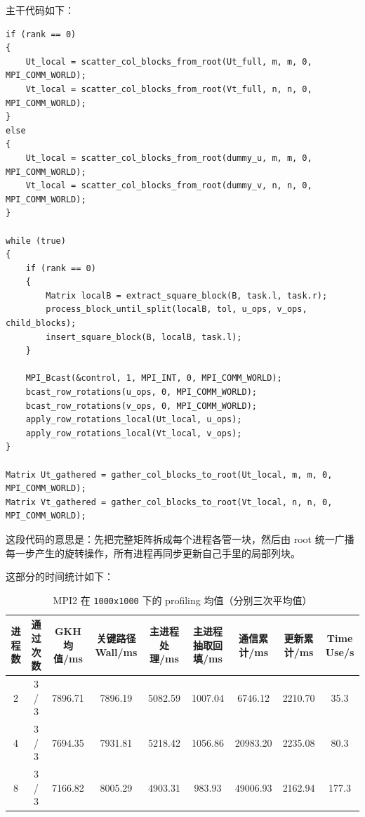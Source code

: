 \documentclass[12pt,a4paper,fontset=none]{ctexart}
\begin{document}
主干代码如下：

\begin{lstlisting}
if (rank == 0)
{
    Ut_local = scatter_col_blocks_from_root(Ut_full, m, m, 0, MPI_COMM_WORLD);
    Vt_local = scatter_col_blocks_from_root(Vt_full, n, n, 0, MPI_COMM_WORLD);
}
else
{
    Ut_local = scatter_col_blocks_from_root(dummy_u, m, m, 0, MPI_COMM_WORLD);
    Vt_local = scatter_col_blocks_from_root(dummy_v, n, n, 0, MPI_COMM_WORLD);
}

while (true)
{
    if (rank == 0)
    {
        Matrix localB = extract_square_block(B, task.l, task.r);
        process_block_until_split(localB, tol, u_ops, v_ops, child_blocks);
        insert_square_block(B, localB, task.l);
    }

    MPI_Bcast(&control, 1, MPI_INT, 0, MPI_COMM_WORLD);
    bcast_row_rotations(u_ops, 0, MPI_COMM_WORLD);
    bcast_row_rotations(v_ops, 0, MPI_COMM_WORLD);
    apply_row_rotations_local(Ut_local, u_ops);
    apply_row_rotations_local(Vt_local, v_ops);
}

Matrix Ut_gathered = gather_col_blocks_to_root(Ut_local, m, m, 0, MPI_COMM_WORLD);
Matrix Vt_gathered = gather_col_blocks_to_root(Vt_local, n, n, 0, MPI_COMM_WORLD);
\end{lstlisting}

这段代码的意思是：先把完整矩阵拆成每个进程各管一块，然后由 root 统一广播每一步产生的旋转操作，所有进程再同步更新自己手里的局部列块。

这部分的时间统计如下：

\begin{table}[H]
    \centering
    \scriptsize
    \caption{MPI2 在 \texttt{1000x1000} 下的 profiling 均值（分别三次平均值）}
    \label{tab:mpi2-results-slot}
    \begin{tabular}{ccccccccc}
        \toprule
        进程数 & 通过次数 & GKH均值/ms & 关键路径Wall/ms & 主进程处理/ms & 主进程抽取回填/ms & 通信累计/ms & 更新累计/ms & Time Use/s \\
        \midrule
        2 & 3 / 3 & 7896.71 & 7896.19 & 5082.59 & 1007.04 & 6746.12  & 2210.70 & 35.3 \\
        4 & 3 / 3 & 7694.35 & 7931.81 & 5218.42 & 1056.86 & 20983.20 & 2235.08 & 80.3 \\
        8 & 3 / 3 & 7166.82 & 8005.29 & 4903.31 & 983.93  & 49006.93 & 2162.94 & 177.3 \\
        \bottomrule
    \end{tabular}
\end{table}
\end{document}
